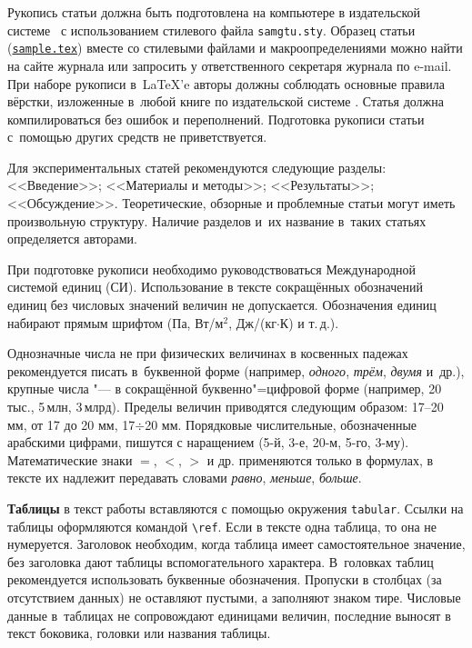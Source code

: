 Рукопись статьи должна быть подготовлена на компьютере в издательской системе \LaTeXe\ с использованием стилевого файла {\tt samgtu.sty}. Образец статьи (\href{http://www.mathnet.ru/supplement/authornotes/sample.zip}{\tt sample.tex}) вместе со стилевыми файлами и макроопределениями можно найти на сайте журнала или запросить у ответственного секретаря журнала по e-mail.
При наборе рукописи в~\LaTeX'e авторы должны соблюдать основные правила вёрстки, изложенные в~любой книге по издательской системе \LaTeXe. Статья должна компилироваться  без ошибок и переполнений.
Подготовка рукописи статьи с~помощью других средств не приветствуется.


Для экспериментальных статей рекомендуются следующие разделы: <<Введение>>; <<Материалы и методы>>; <<Результаты>>; <<Обсуждение>>. 
Теоретические, обзорные и проблемные статьи могут иметь произвольную структуру.
Наличие разделов и~их название в~таких статьях определяется авторами.

\smallskip

 При подготовке рукописи необходимо руководствоваться
Международной системой единиц (СИ). Использование в тексте сокращённых обозначений единиц без
числовых значений величин не допускается.
Обозначения единиц набирают прямым шрифтом (Па, Вт/м$^2$, Дж/(кг$\cdot$К) и т.\,д.).

\smallskip

 Однозначные числа не при физических величинах в косвенных падежах рекомендуется писать в~буквенной форме (например, {\it одного}, {\it трём}, {\it двумя} и~др.), крупные числа "--- в сокращённой буквенно"=цифровой форме (например, 20\,тыс., 5\,млн, 3\,млрд). Пределы величин приводятся следующим образом: 17--20 мм, от 17 до 20 мм, 17$\div$20 мм. Порядковые числительные, обозначенные арабскими цифрами, пишутся с наращением (5-й, 3-е, 20-м, 5-го, 3-му). Математические знаки $=$, $<$, $>$  и др. применяются только  в формулах, в тексте их надлежит передавать словами {\it равно},  {\it меньше},  {\it больше}.

\smallskip


\textbf{Таблицы} в текст работы вставляются с помощью окружения {\tt tabular}. 
Ссылки на таблицы оформляются командой \verb"\ref".
Если в тексте одна таблица, то  она не нумеруется. 
Заголовок необходим, когда таблица имеет самостоятельное значение, без заголовка дают таблицы вспомогательного характера.
В~головках таблиц рекомендуется использовать буквенные обозначения. 
Пропуски в столбцах (за отсутствием данных) не оставляют пустыми, а заполняют знаком тире. 
Числовые данные в~таблицах не сопровождают единицами величин, последние выносят в текст боковика, головки или названия таблицы. 


